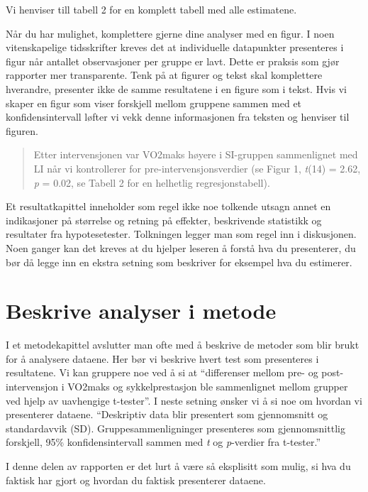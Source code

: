 \documentclass[
  letterpaper,
  DIV=11,
  numbers=noendperiod,
  oneside]{scrreprt}
\begin{document}
Vi henviser till tabell 2 for en komplett tabell med alle estimatene.

Når du har mulighet, komplettere gjerne dine analyser med en figur. I
noen vitenskapelige tidsskrifter kreves det at individuelle datapunkter
presenteres i figur når antallet observasjoner per gruppe er lavt. Dette
er praksis som gjør rapporter mer transparente. Tenk på at figurer og
tekst skal komplettere hverandre, presenter ikke de samme resultatene i
en figure som i tekst. Hvis vi skaper en figur som viser forskjell
mellom gruppene sammen med et konfidensintervall løfter vi vekk denne
informasjonen fra teksten og henviser til figuren.

\begin{quote}
Etter intervensjonen var VO2maks høyere i SI-gruppen sammenlignet med LI
når vi kontrollerer for pre-intervensjonsverdier (se Figur 1,
\emph{t}(14) = 2.62, \emph{p} = 0.02, se Tabell 2 for en helhetlig
regresjonstabell).
\end{quote}

Et resultatkapittel inneholder som regel ikke noe tolkende utsagn annet
en indikasjoner på størrelse og retning på effekter, beskrivende
statistikk og resultater fra hypotesetester. Tolkningen legger man som
regel inn i diskusjonen. Noen ganger kan det kreves at du hjelper
leseren å forstå hva du presenterer, du bør då legge inn en ekstra
setning som beskriver for eksempel hva du estimerer.

\hypertarget{beskrive-analyser-i-metode}{%
\section{Beskrive analyser i metode}\label{beskrive-analyser-i-metode}}

I et metodekapittel avslutter man ofte med å beskrive de metoder som
blir brukt for å analysere dataene. Her bør vi beskrive hvert test som
presenteres i resultatene. Vi kan gruppere noe ved å si at ``differenser
mellom pre- og post-intervensjon i VO2maks og sykkelprestasjon ble
sammenlignet mellom grupper ved hjelp av uavhengige t-tester''. I neste
setning ønsker vi å si noe om hvordan vi presenterer dataene.
``Deskriptiv data blir presentert som gjennomsnitt og standardavvik
(SD). Gruppesammenligninger presenteres som gjennomsnittlig forskjell,
95\% konfidensintervall sammen med \emph{t} og \emph{p}-verdier fra
t-tester.''

I denne delen av rapporten er det lurt å være så eksplisitt som mulig,
si hva du faktisk har gjort og hvordan du faktisk presenterer dataene.
\end{document}
